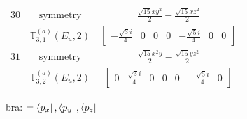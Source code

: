 \documentclass[fleqn,8pt,landscape]{jsarticle}
\begin{document}
\begin{longtable}{ccc}
$ 30 $ & $ \text{symmetry} $ & $ \frac{\sqrt{15} x y^{2}}{2} - \frac{\sqrt{15} x z^{2}}{2} $ \\
$  $ & $ \mathbb{T}_{3,1}^{(a)}(E_{u},2) $ & $ \begin{bmatrix} - \frac{\sqrt{3} i}{4} & 0 & 0 & 0 & - \frac{\sqrt{5} i}{4} & 0 & 0 \end{bmatrix} $ \\ \hline
$ 31 $ & $ \text{symmetry} $ & $ \frac{\sqrt{15} x^{2} y}{2} - \frac{\sqrt{15} y z^{2}}{2} $ \\
$  $ & $ \mathbb{T}_{3,2}^{(a)}(E_{u},2) $ & $ \begin{bmatrix} 0 & \frac{\sqrt{3} i}{4} & 0 & 0 & 0 & - \frac{\sqrt{5} i}{4} & 0 \end{bmatrix} $ \\ \hline
\end{longtable}
bra: $=\bra{p_{x}}, \bra{p_{y}}, \bra{p_{z}}$
\end{document}
